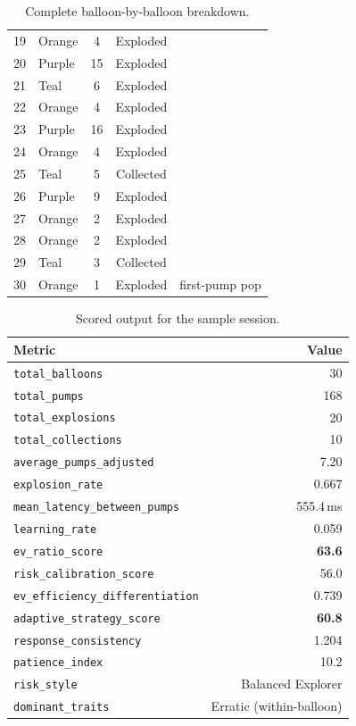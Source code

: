 \documentclass[11pt,a4paper]{article}
\begin{document}
\begin{table}[H]
\begin{tabular}{@{}clccc@{}}
19 & \textcolor{orangeballoon}{Orange} &  4 & Exploded  & \\
20 & \textcolor{purpleballoon}{Purple} & 15 & Exploded  & \\
21 & \textcolor{tealballoon}{Teal}     &  6 & Exploded  & \\
22 & \textcolor{orangeballoon}{Orange} &  4 & Exploded  & \\
23 & \textcolor{purpleballoon}{Purple} & 16 & Exploded  & \\
24 & \textcolor{orangeballoon}{Orange} &  4 & Exploded  & \\
25 & \textcolor{tealballoon}{Teal}     &  5 & Collected & \\
26 & \textcolor{purpleballoon}{Purple} &  9 & Exploded  & \\
27 & \textcolor{orangeballoon}{Orange} &  2 & Exploded  & \\
28 & \textcolor{orangeballoon}{Orange} &  2 & Exploded  & \\
29 & \textcolor{tealballoon}{Teal}     &  3 & Collected & \\
30 & \textcolor{orangeballoon}{Orange} &  1 & Exploded  & first-pump pop \\
\bottomrule
\end{tabular}
\caption{Complete balloon-by-balloon breakdown.}
\end{table}

\begin{table}[H]
\centering
\begin{tabular}{@{}lr@{}}
\toprule
\textbf{Metric} & \textbf{Value} \\
\midrule
\texttt{total\_balloons}               & 30 \\
\texttt{total\_pumps}                  & 168 \\
\texttt{total\_explosions}             & 20 \\
\texttt{total\_collections}            & 10 \\
\texttt{average\_pumps\_adjusted}      & 7.20 \\
\texttt{explosion\_rate}               & 0.667 \\
\texttt{mean\_latency\_between\_pumps} & 555.4\,ms \\
\texttt{learning\_rate}                & 0.059 \\
\texttt{ev\_ratio\_score}              & \textbf{63.6} \\
\texttt{risk\_calibration\_score}      & 56.0 \\
\texttt{ev\_efficiency\_differentiation} & 0.739 \\
\texttt{adaptive\_strategy\_score}     & \textbf{60.8} \\
\texttt{response\_consistency}         & 1.204 \\
\texttt{patience\_index}               & 10.2 \\
\texttt{risk\_style}                   & Balanced Explorer \\
\texttt{dominant\_traits}              & Erratic (within-balloon) \\
\bottomrule
\end{tabular}
\caption{Scored output for the sample session.}
\end{table}
\end{document}
